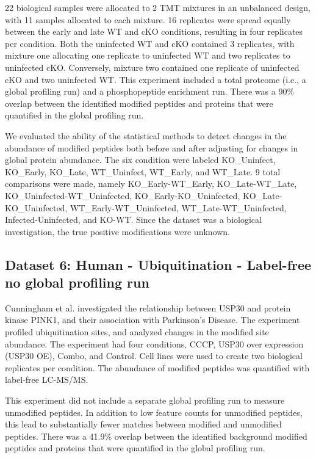 \documentclass[mcp]{article}
\numberwithin{table}{section}
\begin{document}
\medskip {} 22 biological samples were allocated to 2 TMT mixtures in an unbalanced design, with 11 samples allocated to each mixture. 16 replicates were spread equally between the early and late WT and cKO conditions, resulting in four replicates per condition. Both the uninfected WT and cKO contained 3 replicates, with mixture one allocating one replicate to uninfected WT and two replicates to uninfected cKO. Conversely, mixture two contained one replicate of uninfected cKO and two uninfected WT. This experiment included a total proteome (i.e., a global profiling run) and a phosphopeptide enrichment run. There was a 90\% overlap between the identified modified peptides and proteins that were quantified in the global profiling run.

\medskip {} We evaluated the ability of the statistical methods to detect changes in the abundance of modified peptides both before and after adjusting for changes in global protein abundance. The six condition were labeled KO\_Uninfect, KO\_Early, KO\_Late, WT\_Uninfect, WT\_Early, and WT\_Late. 9 total comparisons were made, namely KO\_Early-WT\_Early, KO\_Late-WT\_Late, KO\_Uninfected-WT\_Uninfected, KO\_Early-KO\_Uninfected, KO\_Late-KO\_Uninfected, WT\_Early-WT\_Uninfected, WT\_Late-WT\_Uninfected, Infected-Uninfected, and KO-WT. Since the dataset was a biological investigation, the true positive modifications were unknown.


\subsection*{Dataset 6: Human - Ubiquitination - Label-free no global profiling run}
\label{sec:exp_proc_dataset6}

\medskip {} Cunningham et al. \cite{Cunningham2015} investigated the relationship between USP30 and protein kinase PINK1, and their association with Parkinson’s Disease. The experiment profiled ubiquitination sites, and analyzed changes in the modified site abundance. The experiment had four conditions, CCCP, USP30 over expression (USP30 OE), Combo, and Control. Cell lines were used to create two biological replicates per condition. The abundance of modified peptides was quantified with label-free LC-MS/MS.

\medskip {} This experiment did not include a separate global profiling run to measure unmodified peptides. In addition to low feature counts for unmodified peptides,  this lead to substantially fewer matches between modified and unmodified peptides. There was a 41.9\% overlap between the identified background modified peptides and proteins that were quantified in the global profiling run.
\end{document}
